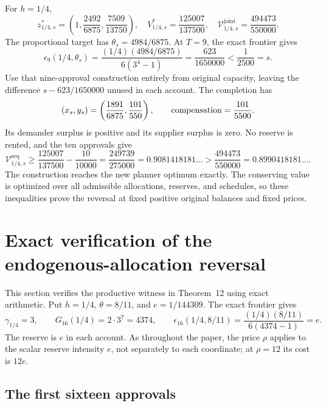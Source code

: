 \documentclass[ecta,draft,supplement]{econsocart}
\theoremstyle{definition}
\theoremstyle{definition}
\begin{document}
\begin{appendix}
For $h=1/4$,
\[
 z_{1/4,s}^*
 =\left(1,\frac{2492}{6875},\frac{7509}{13750}\right),
 \quad V_{1/4,s}^*=\frac{125007}{137500},
 \quad\mathcal V_{1/4,s}^{\mathrm{joint}}
 =\frac{494473}{550000}.
\]
The proportional target has $\theta_s=4984/6875$.
At $T=9$, the exact frontier gives
\[
 \epsilon_9(1/4,\theta_s)
 =\frac{(1/4)(4984/6875)}{6(3^4-1)}
 =\frac{623}{1650000}<\frac1{2500}=s.
\]
Use that nine-approval construction entirely from original capacity,
leaving the difference $s-623/1650000$ unused in each account.
The completion has
\[
 (x_s,y_s)=\left(\frac{1891}{6875},\frac{101}{550}\right),
 \qquad\hbox{compensation}=\frac{101}{5500}.
\]
Its demander surplus is positive and its supplier surplus is zero.
No reserve is rented, and the ten approvals give
\[
 \mathcal V_{1/4,s}^{\mathrm{seq}}
 \geq\frac{125007}{137500}-\frac{10}{10000}
 =\frac{249739}{275000}=0.9081418181\ldots
 >\frac{494473}{550000}=0.8990418181\ldots.
\]
The construction reaches the new planner optimum exactly. The
conserving value is optimized over all admissible allocations,
reserves, and schedules, so these inequalities prove
the reversal at fixed positive original balances and fixed prices.

\section{Exact verification of the endogenous-allocation reversal}
\label{app:endogenousproof}

This section verifies the productive witness in
Theorem~12%
 using exact arithmetic. Put
$h=1/4$, $\theta=8/11$, and $e=1/144309$. The exact frontier gives
\[
 \gamma_{1/4}=3,\qquad G_{16}(1/4)=2\cdot3^7=4374,
 \qquad
 \epsilon_{16}(1/4,8/11)
 =\frac{(1/4)(8/11)}{6(4374-1)}=e.
\]
The reserve is $e$ in each account. As throughout the paper, the price
$\rho$ applies to the scalar reserve intensity $e$, not separately to
each coordinate; at $\rho=12$ its cost is $12e$.

\subsection{The first sixteen approvals}


\end{appendix}
\end{document}

